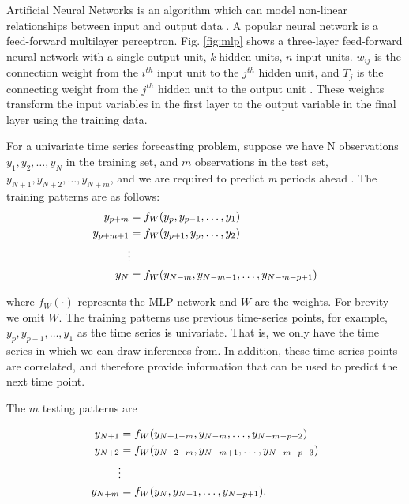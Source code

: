 \documentclass[final,3p,times,twocolumn,numbers]{elsarticle}
\begin{document}
Artificial Neural Networks is an algorithm which can model non-linear relationships between input and output data \cite{Akaike1974}. A popular neural network is a feed-forward multilayer perceptron. Fig. \ref{fig:mlp} shows a three-layer feed-forward neural network with a single output unit, \textit{k} hidden units, $n$ input units. $w_{ij}$ is the connection weight from the $i^{th}$ input unit to the $j^{th}$ hidden unit,  and $T_j$ is the connecting weight from the $j^{th}$ hidden unit to the output unit \cite{Pao2007}. These weights transform the input variables in the first layer to the output variable in the final layer using the training data. 


For a univariate time series forecasting problem, suppose we have N observations $y_1, y_2, \ldots, y_N$ in the training set, and $m$ observations in the test set, $y_{N+1}, y_{N+2}, \ldots, y_{N+m}$, and we are required to predict \textit{m} periods ahead \cite{Pao2007}. The training patterns are as follows:
\begin{align}
y_{p+m} & =f_{W}(y_p, y_{p-1},\ldots,y_1)\\
y_{p+m+1} & =f_{W}(y_{p+1}, y_{p},\ldots,y_2)\\
&\vdotswithin  \notag \\
y_{N} & =f_{W}(y_{N-m},y_{N-m-1},\ldots,y_{N-m-p+1})
\end{align}

\noindent where $f_{W}(\cdot)$ represents the MLP network and $W$ are the weights. For brevity we omit $W$. The training patterns use previous time-series points, for example, $y_p, y_{p-1},\ldots,y_1$ as the time series is univariate. That is, we only have the time series in which we can draw inferences from. In addition, these time series points are correlated, and therefore provide information that can be used to predict the next time point.

The $m$ testing patterns are 

\begin{align}
y_{N+1} & =f_{W}(y_{N+1-m}, y_{N-m},\ldots,y_{N-m-p+2})\\
y_{N+2} & =f_{W}(y_{N+2-m}, y_{N-m+1},\ldots,y_{N-m-p+3})\\
&\vdotswithin  \notag \\
y_{N+m} & =f_{W}(y_{N},y_{N-1},\ldots,y_{N-p+1}).
\end{align}
\end{document}
